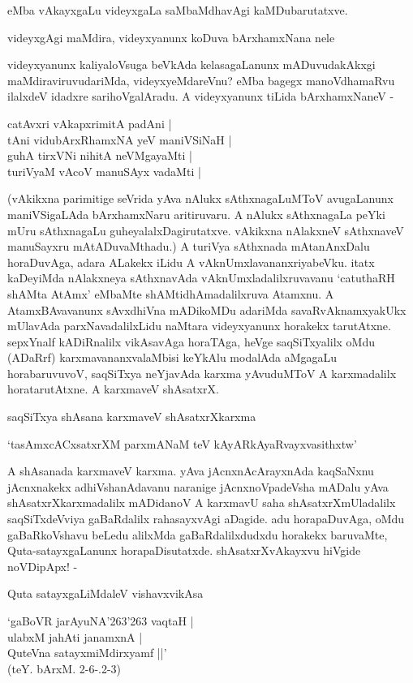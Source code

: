 eMba vAkayxgaLu videyxgaLa saMbaMdhavAgi kaMDubarutatxve.

videyxgAgi maMdira, videyxyanunx koDuva bArxhamxNana nele

videyxyanunx kaliyaloVsuga beVkAda kelasagaLanunx mADuvudakAkxgi maMdiraviruvudariMda, videyxyeMdareVnu? eMba bagegx manoVdhamaRvu ilalxdeV idadxre sarihoVgalAradu. A videyxyanunx tiLida bArxhamxNaneV - 

\begin{shloka}
catAvxri vAkapxrimitA padAni |\\
tAni vidubArxRhamxNA yeV maniVSiNaH |\\
guhA tirxVNi nihitA neVMgayaMti |\\
turiVyaM vAcoV manuSAyx vadaMti |
\end{shloka}

(vAkikxna parimitige seVrida yAva nAlukx sAthxnagaLuMToV avugaLanunx maniVSigaLAda bArxhamxNaru aritiruvaru. A nAlukx sAthxnagaLa peYki mUru sAthxnagaLu guheyalalxDagirutatxve. vAkikxna nAlakxneV sAthxnaveV manuSayxru mAtADuvaMthadu.) A turiVya sAthxnada mAtanAnxDalu horaDuvAga, adara ALakekx iLidu A vAknUmxlavananxriyabeVku. itatx kaDeyiMda nAlakxneya sAthxnavAda vAknUmxladalilxruvavanu `catuthaRH shAMta AtAmx' eMbaMte shAMtidhAmadalilxruva Atamxnu. A AtamxBAvavanunx sAvxdhiVna mADikoMDu adariMda savaRvAknamxyakUkx mUlavAda parxNavadalilxLidu naMtara videyxyanunx horakekx tarutAtxne. sepxYnalf kADiRnalilx vikAsavAga horaTAga, heVge saqSiTxyalilx oMdu (ADaRrf) karxmavananxvalaMbisi keYkAlu modalAda aMgagaLu horabaruvuvoV, saqSiTxya neYjavAda karxma yAvuduMToV A karxmadalilx horatarutAtxne. A karxmaveV shAsatxrX.

saqSiTxya shAsana karxmaveV shAsatxrXkarxma

\begin{shloka}
`tasAmxcACxsatxrXM parxmANaM teV kAyARkAyaRvayxvasithxtw'
\end{shloka}

A shAsanada karxmaveV karxma. yAva jAcnxnAcArayxnAda kaqSaNxnu jAcnxnakekx adhiVshanAdavanu naranige jAcnxnoVpadeVsha mADalu yAva shAsatxrXkarxmadalilx mADidanoV A karxmavU saha shAsatxrXmUladalilx saqSiTxdeVviya gaBaRdalilx rahasayxvAgi aDagide. adu horapaDuvAga, oMdu gaBaRkoVshavu beLedu alilxMda gaBaRdalilxdudxdu horakekx baruvaMte, Quta-satayxgaLanunx horapaDisutatxde. shAsatxrXvAkayxvu hiVgide noVDipApx! - 

Quta satayxgaLiMdaleV vishavxvikAsa

\begin{shloka}
`gaBoVR jarAyuNA\char'263\char'263 vaqtaH |\\
ulabxM ja{hA}ti janamxnA |\\
QuteVna satayxmiMdirxyamf ||'\\
(teY. bArxM. 2-6-.2-3)
\end{shloka}

